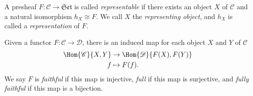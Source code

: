 \documentclass[10pt]{amsart}
\begin{document}
%  

\begin{defn}
  A presheaf $F \colon \mathscr{C} \rightarrow \mathfrak{Set}$ is called {\em representable} if there exists an object $X$ of $\mathscr{C}$ and a natural isomorphism $h_X \cong F$.
  We call $X$ the {\em representing object}, and $h_X$ is called a {\em representation} of $F$.
\end{defn}

\begin{defn}
  Given a functor $F : \mathscr{C} \rightarrow \mathscr{D}$, there is an induced map for each object $X$ and $Y$ of $\mathscr{C}$
  \begin{align*}
    \Hom{\mathscr{C}}{X,Y} &\rightarrow \Hom{\mathscr{D}}{F(X), F(Y)}\\
    f &\mapsto F(f).
  \end{align*}
  We say $F$ is {\em faithful} if this map is injective, {\em full} if this map is surjective, and {\em fully faithful} if this map is a bijection.
\end{defn}
\end{document}
